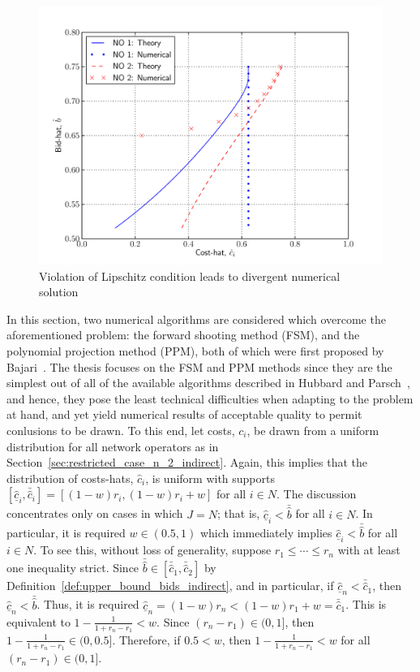 \begin{figure}[t]
  \includegraphics[width=\figsize]{Indirect/Figures/lipschitz}
  \caption{Violation of Lipschitz condition leads to divergent numerical solution}
  \label{fig:lipschitz_indirect}
\end{figure}

In this section, two numerical algorithms are considered which overcome the aforementioned problem: the forward shooting method (FSM), and the polynomial projection method (PPM), both of which were first proposed by Bajari~\cite{Bajari2001a}. The thesis focuses on the FSM and PPM methods since they are the simplest out of all of the available algorithms described in Hubbard and Parsch~\cite{HubbardPaarsch2011}, and hence, they pose the least technical difficulties when adapting to the problem at hand, and yet yield numerical results of acceptable quality to permit conlusions to be drawn. To this end, let costs, $c_i$, be drawn from a uniform distribution for all network operators as in Section~\ref{sec:restricted_case_n_2_indirect}. Again, this implies that the distribution of costs-hats, $\hat{c}_i$, is uniform with supports $[\underline{\hat{c}}_i, \bar{\hat{c}}_i] = [(1-w)r_i, (1-w)r_i + w]$ for all $i\in N$. The discussion concentrates only on cases in which $J=N$; that is, $\underline{\hat{c}}_i < \bar{\hat{b}}$ for all $i\in N$. In particular, it is required $w\in\left(0.5, 1\right)$ which immediately implies $\underline{\hat{c}}_i < \bar{\hat{b}}$ for all $i\in N$. To see this, without loss of generality, suppose $r_1\leq\cdots\leq r_n$ with at least one inequality strict. Since $\bar{\hat{b}}\in[\bar{\hat{c}}_1, \bar{\hat{c}}_2]$ by Definition~\ref{def:upper_bound_bids_indirect}, and in particular, if $\underline{\hat{c}}_n < \bar{\hat{c}}_1$, then $\underline{\hat{c}}_n < \bar{\hat{b}}$. Thus, it is required $\underline{\hat{c}}_n = (1-w)r_n < (1-w)r_1 + w = \bar{\hat{c}}_1$. This is equivalent to $1 - \frac{1}{1+r_n-r_1} < w$. Since $(r_n - r_1)\in (0, 1]$, then $1 - \frac{1}{1+r_n-r_1} \in (0,0.5]$. Therefore, if $0.5 < w$, then $1 - \frac{1}{1+r_n-r_1} < w$ for all $(r_n-r_1)\in (0,1]$.

